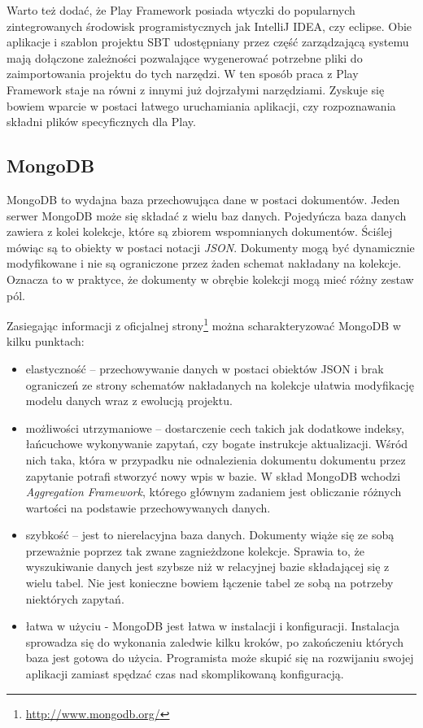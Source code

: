 \documentclass[brudnopis]{xmgr}
\begin{document}
Warto też dodać, że Play Framework posiada wtyczki do popularnych zintegrowanych środowisk programistycznych jak IntelliJ IDEA, czy eclipse. Obie aplikacje i szablon projektu SBT udostępniany przez część zarządzającą systemu mają dołączone zależności pozwalające wygenerować potrzebne pliki do zaimportowania projektu do tych narzędzi. W ten sposób praca z Play Framework staje na równi z innymi już dojrzałymi narzędziami. Zyskuje się bowiem wparcie w postaci łatwego uruchamiania aplikacji, czy rozpoznawania składni plików specyficznych dla Play.

\subsection{MongoDB}

MongoDB to wydajna baza przechowująca dane w postaci dokumentów. Jeden serwer MongoDB może się składać z wielu baz danych. Pojedyńcza baza danych zawiera z kolei kolekcje, które są zbiorem wspomnianych dokumentów. Ściślej mówiąc są to obiekty w postaci notacji \emph{JSON}. Dokumenty mogą być dynamicznie modyfikowane i nie są ograniczone przez żaden schemat nakładany na kolekcje. Oznacza to w praktyce, że dokumenty w obrębie kolekcji mogą mieć różny zestaw pól.

Zasiegając informacji z oficjalnej strony\footnote{\url{http://www.mongodb.org/}} można scharakteryzować MongoDB w kilku punktach:

\begin{itemize}
\item elastyczność -- przechowywanie danych w postaci obiektów JSON i brak ograniczeń ze strony schematów nakładanych na kolekcje ułatwia modyfikację modelu danych wraz z ewolucją projektu.
\item możliwości utrzymaniowe -- dostarczenie cech takich jak dodatkowe indeksy, łańcuchowe wykonywanie zapytań, czy bogate instrukcje aktualizacji. Wśród nich taka, która w przypadku nie odnalezienia dokumentu dokumentu przez zapytanie potrafi stworzyć nowy wpis w bazie. W skład MongoDB wchodzi \emph{Aggregation Framework}, którego głównym zadaniem jest obliczanie różnych wartości na podstawie przechowywanych danych.
\item szybkość -- jest to nierelacyjna baza danych. Dokumenty wiąże się ze sobą przeważnie poprzez tak zwane zagnieżdzone kolekcje. Sprawia to, że wyszukiwanie danych jest szybsze niż w relacyjnej bazie składającej się z wielu tabel. Nie jest konieczne bowiem łączenie tabel ze sobą na potrzeby niektórych zapytań.
\item łatwa w użyciu - MongoDB jest łatwa w instalacji i konfiguracji. Instalacja sprowadza się do wykonania zaledwie kilku kroków, po zakończeniu których baza jest gotowa do użycia. Programista może skupić się na rozwijaniu swojej aplikacji zamiast spędzać czas nad skomplikowaną konfiguracją.
\end{itemize}
\end{document}
